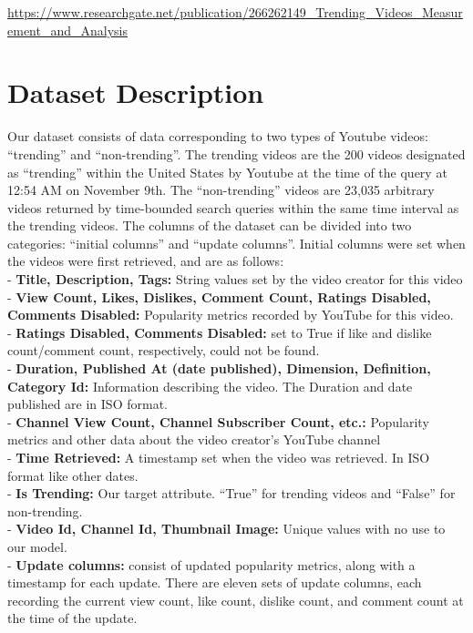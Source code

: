 \documentclass{article}
\begin{document}
\href{https://www.researchgate.net/publication/266262149_Trending_Videos_Measurement_and_Analysis}{https://www.researchgate.net/publication/266262149\_Trending\_Videos\_Measurement\_and\_Analysis} 

\section*{Dataset Description}

\noindent
\quad Our dataset consists of data corresponding to two types of Youtube videos: “trending” and “non-trending”. The trending videos are the 200 videos designated as “trending” within the United States by Youtube at the time of the query at 12:54 AM on November 9th. The “non-trending” videos are 23,035 arbitrary videos returned by time-bounded search queries within the same time interval as the trending videos. The columns of the dataset can be divided into two categories: “initial columns” and “update columns”. Initial columns were set when the videos were first retrieved, and are as follows: \\

\noindent
- \textbf{Title, Description, Tags:} String values set by the video creator for this video \\
- \textbf{View Count, Likes, Dislikes, Comment Count, Ratings Disabled, Comments Disabled:} Popularity metrics recorded by YouTube for this video. \\
- \textbf{Ratings Disabled, Comments Disabled:} set to True if like and dislike count/comment count, respectively, could not be found. \\
- \textbf{Duration, Published At (date published), Dimension, Definition, Category Id:} Information describing the video. The Duration and date published are in ISO format. \\
- \textbf{Channel View Count, Channel Subscriber Count, etc.:} Popularity metrics and other data about the video creator’s YouTube channel \\
- \textbf{Time Retrieved:} A timestamp set when the video was retrieved. In ISO format like other dates. \\
- \textbf{Is Trending:} Our target attribute. “True” for trending videos and “False” for non-trending. \\
- \textbf{Video Id, Channel Id, Thumbnail Image:} Unique values with no use to our model. \\
- \textbf{Update columns:} consist of updated popularity metrics, along with a timestamp for each update. There are eleven sets of update columns, each recording the current view count, like count, dislike count, and comment count at the time of the update. \\
\end{document}
